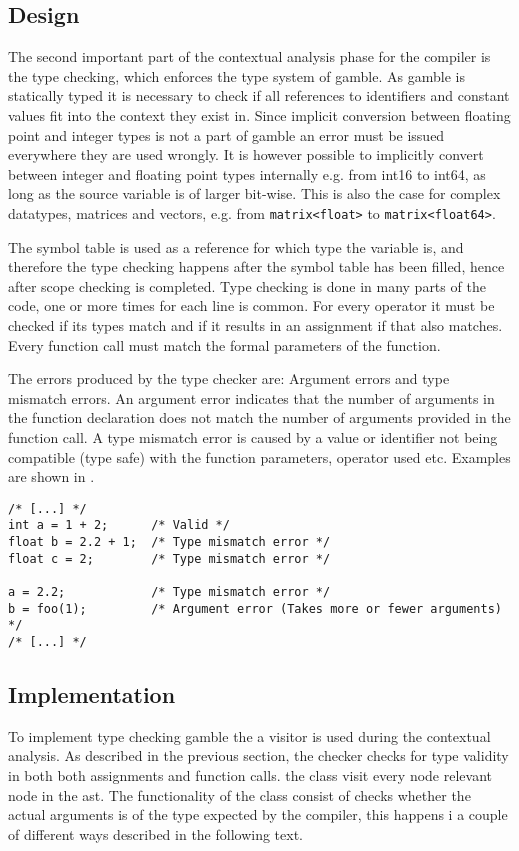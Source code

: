 \subsection*{Design}
The second important part of the contextual analysis phase for the compiler is the type checking, which enforces the type system of \gls{gamble}.
As \gls{gamble} is statically typed it is necessary to check if all references to identifiers and constant values fit into the context they exist in. 
Since implicit conversion between floating point and integer types is not a part of \gls{gamble} an error must be issued everywhere they are used wrongly. 
It is however possible to implicitly convert between integer and floating point types internally e.g. from int16 to int64, as long as the source variable is of larger bit-wise.
This is also the case for complex datatypes, matrices and vectors, e.g. from \texttt{matrix<float>} to \texttt{matrix<float64>}. 

The symbol table is used as a reference for which type the variable is, and therefore the type checking happens after the symbol table has been filled, hence after scope checking is completed. 
Type checking is done in many parts of the code, one or more times for each line is common. 
For every operator it must be checked if its types match and if it results in an assignment if that also matches.
Every function call must match the formal parameters of the function. 

The errors produced by the type checker are: Argument errors and type mismatch errors.
An argument error indicates that the number of arguments in the function declaration does not match the number of arguments provided in the function call.
A type mismatch error is caused by a value or identifier not being compatible (type safe) with the function parameters, operator used etc.
Examples are shown in .

\begin{lstlisting}[caption=Examples of type errors in \gls{gamble},numbers=none,frame=tlrb,label={lst:typeErrors}]
/* [...] */
int a = 1 + 2;      /* Valid */
float b = 2.2 + 1;  /* Type mismatch error */
float c = 2;        /* Type mismatch error */

a = 2.2;            /* Type mismatch error */
b = foo(1);         /* Argument error (Takes more or fewer arguments) */ 
/* [...] */
\end{lstlisting}

\subsection*{Implementation}
To implement type checking \gls{gamble} the a visitor is used during the contextual analysis.
As described in the previous section, the checker checks for type validity in both both assignments and function calls.
the class  visit every node relevant node in the \acrshort{ast}. 
The functionality of the class consist of checks whether the actual arguments is of the type expected by the compiler, this happens i a couple of different ways described in the following text.